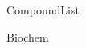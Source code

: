 \documentclass[10pt,a4paper]{article}
\begin{document}
	

{CompoundList}

\tableofcontents




{Biochem}

\newpage
{}

\end{document}
